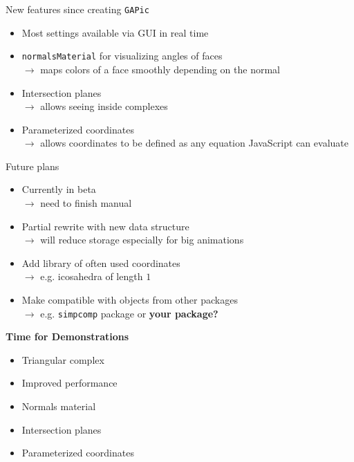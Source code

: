 \documentclass{beamer}
\numberwithin{equation}{aufgabe}
\begin{document}
\begin{frame}
    \begin{exampleblock}{New features since creating \texttt{GAPic}}
        \begin{itemize}[label=-]
            \item Most settings available via GUI in real time \pause
            \item \texttt{normalsMaterial} for visualizing angles of faces\\
            $\xrightarrow{}$ maps colors of a face smoothly depending on the normal \pause
            \item Intersection planes\\
            $\xrightarrow{}$ allows seeing inside complexes \pause
            \item Parameterized coordinates \\
            $\xrightarrow{}$ allows coordinates to be defined as any equation JavaScript can evaluate
        \end{itemize}
    \end{exampleblock}
\end{frame}

\begin{frame}
    \begin{exampleblock}{Future plans}
        \begin{itemize}[label=-]
            \item Currently in beta\\
            $\xrightarrow{}$ need to finish manual \pause
            \item Partial rewrite with new data structure\\
            $\xrightarrow{}$ will reduce storage especially for big animations
            \item Add library of often used coordinates \\
            $\xrightarrow{}$ e.g. icosahedra of length $1$\cite{ico}\pause
            \item Make compatible with objects from other packages\\
            $\xrightarrow{}$ e.g. \texttt{simpcomp} package or \pause\textbf{your package?}
        \end{itemize}
    \end{exampleblock}
\end{frame}

\begin{frame}
    \begin{center}
        \textbf{Time for Demonstrations}
    \end{center}
    \pause
    \bigskip
    \begin{itemize}[label=-]
        \item Triangular complex
        \item Improved performance
        \item Normals material
        \item Intersection planes
        \item Parameterized coordinates
    \end{itemize}
\end{frame}
\end{document}
